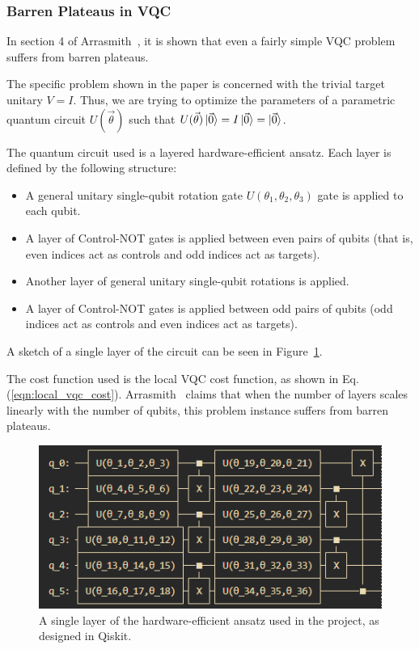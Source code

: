 \documentclass[a4paper,12pt]{article}
\newcommand{\thetas}{\vec{\theta}}
\newenvironment{denseitemize}%
  {\begin{itemize}%
    \setlength{\itemsep}{0pt}}%
  {\end{itemize}}
\begin{document}
\subsubsection{Barren Plateaus in VQC} \label{subsec:vqc_bp}
In section 4 of Arrasmith~\cite{arrasmith_effect_2021}, it is shown that even a fairly simple VQC problem suffers from barren plateaus.

The specific problem shown in the paper is concerned with the trivial target unitary $V = I$.
Thus, we are trying to optimize the parameters of a parametric quantum circuit $U(\thetas)$ such that $U(\thetas)\ket{\vec{0}} = I\ket{\vec{0}} = \ket{\vec{0}}$.

The quantum circuit used is a layered hardware-efficient ansatz.
Each layer is defined by the following structure:
\begin{denseitemize}
    \item A general unitary single-qubit rotation gate $U(\theta_1, \theta_2, \theta_3)$ gate is applied to each qubit.
    \item A layer of Control-NOT gates is applied between even pairs of qubits (that is, even indices act as controls and odd indices act as targets).
    \item Another layer of general unitary single-qubit rotations is applied.
    \item A layer of Control-NOT gates is applied between odd pairs of qubits (odd indices act as controls and even indices act as targets).
\end{denseitemize}
A sketch of a single layer of the circuit can be seen in Figure~\ref{fig:layer}.

The cost function used is the local VQC cost function, as shown in Eq. (\ref{eqn:local_vqc_cost}).
Arrasmith~\cite{arrasmith_effect_2021} claims that when the number of layers scales linearly with the number of qubits, this problem instance suffers from barren plateaus.

\begin{figure}[h]
    \centering
    \captionsetup{justification=centering, margin=0.5cm}
    \includegraphics{arrasmith_layer.png}
    \caption{A single layer of the hardware-efficient ansatz used in the project, as designed in Qiskit.}
    \label{fig:layer}
\end{figure}
\end{document}

